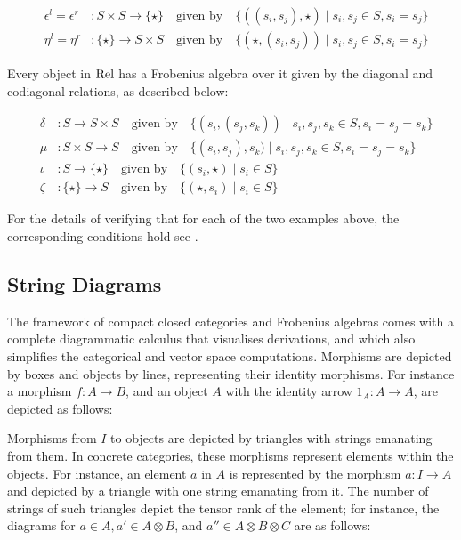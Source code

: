 \begin{eqnarray*}
&\epsilon^l  =  \epsilon^r &\colon   S \times S \to \{\star\} \quad \mbox{given by} \quad
\{((s_i, s_j), \star) \mid s_i, s_j \in S, s_i = s_j \}\\
&\eta^l = \eta^r& \colon   \{\star\}  \to S \times S
\quad \mbox{given by} \quad 
\{(\star, (s_i, s_j)) \mid s_i, s_j \in S, s_i = s_j\}
\end{eqnarray*}



Every object in $\mathrm{Rel}$  has a
Frobenius algebra over it given by the diagonal and codiagonal
relations, as described below: 



\begin{eqnarray*}
&\delta &\colon   S \to S \times S \quad \mbox{given by} \quad
\{(s_i, (s_j, s_k)) \mid s_i, s_j, s_k \in S, s_i = s_j  = s_k\}\\
& \mu & \colon   S \times S \to S
\quad \mbox{given by} \quad 
\{(s_i, s_j), s_k) \mid s_i, s_j, s_k\in S, s_i = s_j= s_k\}\\
& \iota& \colon S \to  \{\star\}    \quad \mbox{given by} \quad \{(s_i, \star) \mid s_i \in S\}\\
&\zeta& \colon  \{\star\}  \to S  \quad \mbox{given by} \quad \{(\star, s_i) \mid s_i \in S\}
\end{eqnarray*}

For the details of verifying that for each of the two examples above,  the corresponding conditions hold see \cite{CoeckePaq}. 

\subsection{String Diagrams} 
\label{string}

The framework of compact closed categories and Frobenius algebras
comes with a complete diagrammatic calculus that visualises
derivations, and which also simplifies the
categorical and vector space computations. Morphisms are depicted by
boxes and objects by lines, representing their identity morphisms. For
instance a morphism $f \colon A \to B$, and an object $A$ with the
identity arrow $1_A \colon A \to A$, are depicted as follows:

\begin{center}
\end{center}

Morphisms from $I$ to objects are depicted by triangles with strings emanating from them. In concrete categories, these morphisms represent  elements within the  objects. For instance, an element $a$ in $A$ is represented by the morphism $a: I \to A$ and depicted by a  triangle with one string emanating from it. The number of strings of such triangles depict the tensor rank of the element; for instance, the
diagrams for ${a} \in A, {a'} \in A \otimes B$, and ${a''}
\in A \otimes B \otimes C$ are as follows:

